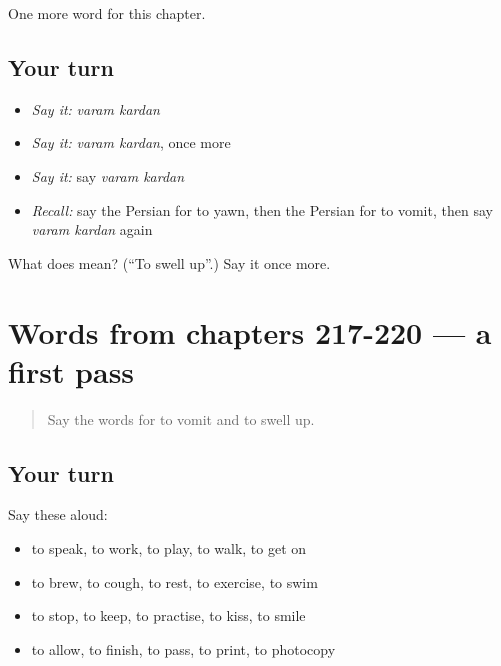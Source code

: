 \begin{grammarlens}[title={What you've built}]
One more word for this chapter.
\end{grammarlens}

\subsection*{Your turn}
\begin{itemize}
\raggedright
  \item \emph{Say it:} \emph{varam kardan}
  \item \emph{Say it:} \emph{varam kardan}, once more
  \item \emph{Say it:} say \emph{varam kardan}
  \item \emph{Recall:} say the Persian for to yawn, then the Persian for to vomit, then say \emph{varam kardan} again
\end{itemize}

\begin{tcolorbox}[breakable,colback=teal!4,colframe=teal!35!black,title={Before you move on}]
What does   mean? (\textquotedblleft{}To swell up\textquotedblright{}.) Say it once more.
\end{tcolorbox}
\section[(dialogue)]{Words from chapters 217-220 — a first pass}

\label{lesson:FA-R225-first-pass-words-from-chapters-217-220}



\begin{quote}
Say the words for to vomit and to swell up.
\end{quote}

\subsection*{Your turn}
Say these aloud:

\begin{itemize}
\raggedright
  \item to speak, to work, to play, to walk, to get on
  \item to brew, to cough, to rest, to exercise, to swim
  \item to stop, to keep, to practise, to kiss, to smile
  \item to allow, to finish, to pass, to print, to photocopy
\end{itemize}

